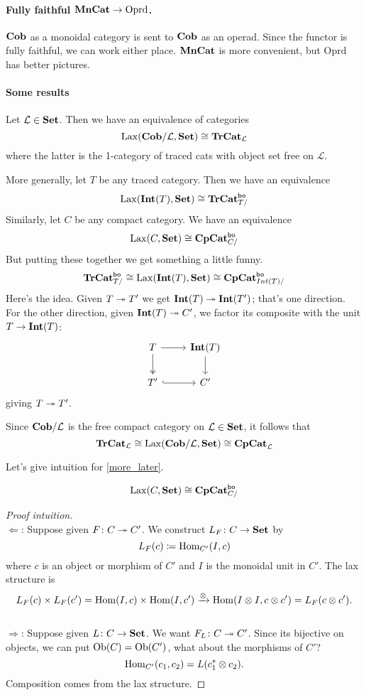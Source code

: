 \documentclass[11pt,oneside,article]{memoir}
\renewcommand{\LabSet}{\mathcal{L}}
\begin{document}
\paragraph{Fully faithful $\mathbf{MnCat}\to\text{Oprd}$.} $\mathbf{Cob}$ as a monoidal category is sent to $\mathbf{Cob}$ as an operad. Since the functor is fully faithful, we can work either place. $\mathbf{MnCat}$ is more convenient, but $\text{Oprd}$ has better pictures.

\paragraph{Some results}
Let $\LabSet\in\Set$. Then we have an equivalence of categories
\[\Lax(\Cob/\LabSet,\Set)\cong\TrCat_{\LabSet}\]
where the latter is the 1-category of traced cats with object set free on $\LabSet$.

More generally, let $T$ be any traced category. Then we have an equivalence
\[\operatorname{Lax}(\mathbf{Int}(T),\mathbf{Set})\cong\mathbf{TrCat}^{\mathsf{bo}}_{T/}\]
Similarly, let $C$ be any compact category. We have an equivalence
\begin{equation}\label{more_later}
\operatorname{Lax}(C,\mathbf{Set})\cong\mathbf{CpCat}^{\mathsf{bo}}_{C/}
\end{equation}
But putting these together we get something a little funny.
\[\mathbf{TrCat}^{\mathsf{bo}}_{T/}\cong\operatorname{Lax}(\mathbf{Int}(T),\mathbf{Set})\cong\mathbf{CpCat}^{\mathsf{bo}}_{Int(T)/}\]
Here's the idea. Given $T\twoheadrightarrow T'$ we get $\mathbf{Int}(T)\twoheadrightarrow\mathbf{Int}(T')$; that's one direction. For the other direction, given $\mathbf{Int}(T)\twoheadrightarrow C'$, we factor its composite with the unit $T\to\mathbf{Int}(T)$:
\[
\begin{tikzcd}
T\ar[r]\ar[d,two heads]&\Int(T)\ar[d]\\
T'\ar[r,hook]&C'
\end{tikzcd}
\]
giving $T\twoheadrightarrow T'$.
\begin{corollary}
Since $\Cob/\LabSet$ is the free compact category on $\LabSet\in\Set$, it follows that 
\[\TrCat_\LabSet\cong\Lax(\Cob/\LabSet,\Set)\cong\CompCat_{\LabSet}\]
\end{corollary}

Let's give intuition for \eqref{more_later}.
\begin{theorem}
\[\operatorname{Lax}(C,\mathbf{Set})\cong\mathbf{CpCat}^{\mathsf{bo}}_{C/}\]
\end{theorem}
\begin{proof}[Proof intuition]
~\\
$\Leftarrow$: Suppose given $F\colon C\twoheadrightarrow C'$. We construct $L_F\colon C\to\mathbf{Set}$ by
\[L_F(c)\coloneqq\operatorname{Hom}_{C'}(I,c)\]
where $c$ is an object or morphism of $C'$ and $I$ is the monoidal unit in $C'$. The lax structure is 
\[
L_F(c)\times L_F(c')=\operatorname{Hom}(I,c)\times\operatorname{Hom}(I,c')\xrightarrow{\otimes}
\operatorname{Hom}(I\otimes I,c\otimes c')=L_F(c\otimes c').
\]
~\\
$\Rightarrow$: Suppose given $L\colon C\to\mathbf{Set}$. We want $F_L\colon C\twoheadrightarrow C'$. Since its bijective on objects, we can put $\mathrm{Ob}(C)=\mathrm{Ob}(C')$, what about the morphisms of $C'$?
\[
\operatorname{Hom}_{C'}(c_1,c_2)=L(c_1^*\otimes c_2).
\]
Composition comes from the lax structure.
\end{proof}
\end{document}
